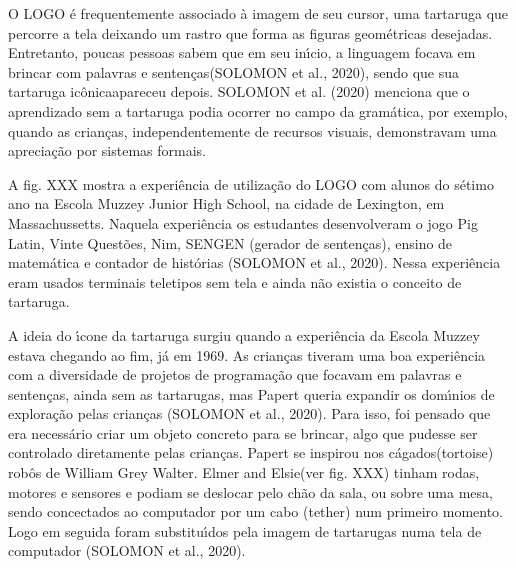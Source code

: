 \documentclass[
12pt,		%
openright,	%
twoside,  %
a4paper,			%
chapter=TITLE,		%
english,			%
french,				%
spanish,			%
brazil				%
]{USPSC-classe/USPSC}
\begin{document}
O LOGO \'e frequentemente associado \`a imagem de seu cursor, uma tartaruga que percorre a tela deixando um rastro que forma as figuras geom\'etricas desejadas. Entretanto, poucas pessoas sabem que em seu in\'{\i}cio, a linguagem \textquotedbl focava em brincar com palavras e senten\c{c}as\textquotedbl  (SOLOMON et al., 2020), sendo que sua tartaruga \textquotedbl ic\^onica\textquotedbl  apareceu depois.  SOLOMON et al. (2020) menciona que o aprendizado sem a tartaruga podia ocorrer no campo da gram\'atica, por exemplo, quando as crian\c{c}as, independentemente de recursos visuais, demonstravam uma aprecia\c{c}\~ao por sistemas formais.










A fig. XXX mostra a experi\^encia de utiliza\c{c}\~ao do LOGO com alunos do s\'etimo ano na Escola Muzzey Junior High School, na cidade de Lexington, em Massachussetts. Naquela experi\^encia os estudantes desenvolveram o jogo Pig Latin, Vinte Quest\~oes, Nim, SENGEN (gerador de senten\c{c}as), ensino de matem\'atica e contador de hist\'orias  (SOLOMON et al., 2020). Nessa experi\^encia eram usados terminais teletipos sem tela e ainda n\~ao existia o conceito de tartaruga.










A ideia do \'{\i}cone da tartaruga surgiu quando a experi\^encia da Escola Muzzey estava chegando ao fim, j\'a em 1969. As crian\c{c}as tiveram uma boa experi\^encia com a diversidade de projetos de programa\c{c}\~ao que focavam em palavras e senten\c{c}as, ainda sem as tartarugas, mas Papert queria expandir os dom\'{\i}nios de explora\c{c}\~ao pelas crian\c{c}as  (SOLOMON et al., 2020). Para isso, foi pensado que era necess\'ario criar um objeto concreto para se brincar, algo que pudesse ser controlado diretamente pelas crian\c{c}as. Papert se inspirou nos \textquotedbl c\'agados\textquotedbl   (tortoise) rob\^os de William Grey Walter. \textquotedbl Elmer and Elsie\textquotedbl  (ver fig. XXX) tinham rodas, motores e sensores e podiam se deslocar pelo ch\~ao da sala, ou sobre uma mesa, sendo concectados ao computador por um cabo (tether) num primeiro momento. Logo em seguida foram substitu\'{\i}dos pela imagem de tartarugas numa tela de computador (SOLOMON et al., 2020).
\end{document}
